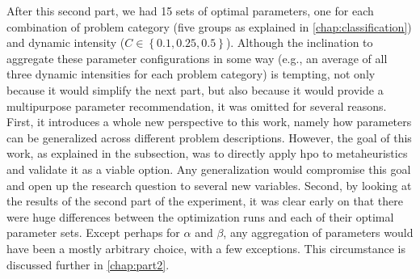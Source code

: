 After this second part, we had 15 sets of optimal parameters, one for each combination of problem category (five groups as explained in \cref{chap:classification}) and dynamic intensity ($C \in \left\lbrace 0.1,0.25,0.5\right\rbrace$). Although the inclination to aggregate these parameter configurations in some way (e.g., an average of all three dynamic intensities for each problem category) is tempting,  not only because it would simplify the next part, but also because it would provide a multipurpose parameter recommendation, it was omitted for several reasons. First, it introduces a whole new perspective to this work, namely how parameters can be generalized across different problem descriptions. However, the goal of this work, as explained in the   subsection, was to directly apply \glsdesc{hpo} to metaheuristics and validate it as a viable option. Any generalization would compromise this goal and open up the research question to several new variables. Second, by looking at the results of the second part of the experiment, it was clear early on that there were huge differences between the optimization runs and each of their optimal parameter sets. Except perhaps for $\alpha$ and $\beta$, any aggregation of parameters would have been a mostly arbitrary choice, with a few exceptions. This circumstance is discussed further in \cref{chap:part2}.

